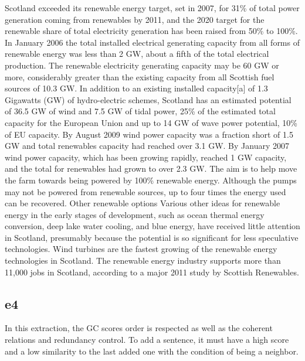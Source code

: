 \begin{tcolorbox}\footnotesize
	Scotland exceeded its renewable energy target, set in 2007, for 31\% of total power generation coming from renewables by 2011, and the 2020 target for the renewable share of total electricity generation has been raised from 50\% to 100\%.
	In January 2006 the total installed electrical generating capacity from all forms of renewable energy was less than 2 GW, about a fifth of the total electrical production.
	The renewable electricity generating capacity may be 60 GW or more, considerably greater than the existing capacity from all Scottish fuel sources of 10.3 GW.
	In addition to an existing installed capacity[a] of 1.3 Gigawatts (GW) of hydro-electric schemes, Scotland has an estimated potential of 36.5 GW of wind and 7.5 GW of tidal power, 25\% of the estimated total capacity for the European Union and up to 14 GW of wave power potential, 10\% of EU capacity.
	By August 2009 wind power capacity was a fraction short of 1.5 GW and total renewables capacity had reached over 3.1 GW.
	By January 2007 wind power capacity, which has been growing rapidly, reached 1 GW capacity, and the total for renewables had grown to over 2.3 GW.
	The aim is to help move the farm towards being powered by 100\% renewable energy.
	Although the pumps may not be powered from renewable sources, up to four times the energy used can be recovered.
	Other renewable options Various other ideas for renewable energy in the early stages of development, such as ocean thermal energy conversion, deep lake water cooling, and blue energy, have received little attention in Scotland, presumably because the potential is so significant for less speculative technologies.
	Wind turbines are the fastest growing of the renewable energy technologies in Scotland.
	The renewable energy industry supports more than 11,000 jobs in Scotland, according to a major 2011 study by Scottish Renewables.
\end{tcolorbox}

\subsection{e4}

In this extraction, the GC scores order is respected as well as the coherent relations and redundancy control.
To add a sentence, it must have a high score and a low similarity to the last added one with the condition of being a neighbor.

